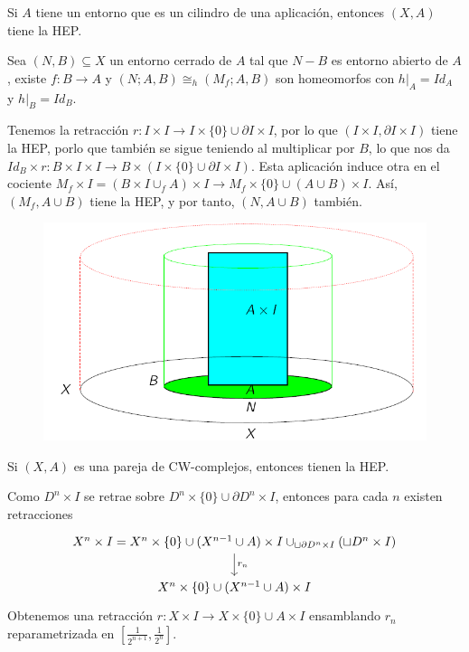 \documentclass[TA.tex]{subfiles}
\begin{document}
\begin{prop}
Si $A$ tiene un entorno que es un cilindro de una aplicación, entonces $(X,A)$ tiene la HEP. 
\end{prop}

Sea $(N,B)\subseteq X$ un entorno cerrado de $A$ tal que $N-B$ es entorno abierto de $A$, existe $f:B\to A$ y $(N;A,B)\cong_h (M_f;A,B)$ son homeomorfos con $h|_A=Id_A$ y $h|_B=Id_B$. 

Tenemos la retracción $r:I\times I\to I\times\{0\}\cup \partial I\times I$, por lo que $(I\times I,\partial I\times I)$ tiene la HEP, porlo que también se sigue teniendo al multiplicar por $B$, lo que nos da $Id_B\times r:B\times I\times I\to B\times(I\times \{0\}\cup\partial I\times I)$. Esta aplicación induce otra en el cociente $M_f\times I=(B\times I\cup_f A)\times I\to M_f\times\{0\}\cup(A\cup B)\times I$. Así, $(M_f,A\cup B)$ tiene la HEP, y por tanto, $(N,A\cup B)$ también.

\begin{figure}[h!]
\includegraphics[scale=0.5]{mpc}
\end{figure}

\begin{prop}
Si $(X,A)$ es una pareja de CW-complejos, entonces tienen la HEP. 
\end{prop}
\begin{dem}
Como $D^n\times I$ se retrae sobre $D^n\times\{0\}\cup\partial D^n\times I$, entonces para cada $n$ existen retracciones 
\[
\begin{tikzcd}
X^n\times I=X^n\times\{0\}\cup (X^{n-1}\cup A)\times I\cup_{\sqcup \partial D^n\times I}(\sqcup D^n\times I)\arrow[d, "r_n"]\\
X^n\times\{0\}\cup (X^{n-1}\cup A)\times I
\end{tikzcd}
\]
Obtenemos una retracción $r:X\times I \to X\times\{0\}\cup A\times I$ ensamblando $r_n$ reparametrizada en $\left[\frac{1}{2^{n+1}},\frac{1}{2^{n}}\right]$.
\end{dem}
\end{document}
